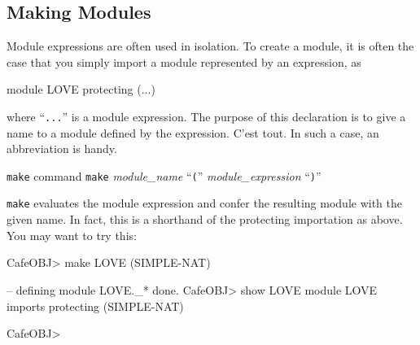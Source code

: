 \documentclass[a4paper]{memoir}
\begin{document}
\subsection{Making Modules}\label{sec:p2-make-command}

Module expressions are often used in isolation. To create a module, it is
often the case that you simply import a module represented by an expression,
as
\begin{vvtm}
\begin{ccode}
  module LOVE {
    protecting (...)
 }
\end{ccode}
\end{vvtm}
where ``\verb|...|'' is a module expression. The purpose of this
declaration is to give a name to a module defined by the expression.
C'est tout. In such a case, an abbreviation is handy.

\begin{bsyntax} \texttt{make} command  \Hline
\texttt{make} \textit{module\_name} ``\texttt{(}'' \textit{module\_expression} ``\texttt{)}''
\end{bsyntax}

\verb|make| evaluates the module expression and confer the resulting
module with the given name.
In fact, this is a shorthand of the protecting importation as above.
You may want to try this:
\begin{vvtm}
\begin{ccode}
  CafeOBJ> make LOVE (SIMPLE-NAT)

  -- defining module LOVE._* done.
  CafeOBJ> show LOVE
  module LOVE {
    imports {
      protecting (SIMPLE-NAT)
    }
  }

  CafeOBJ> 
\end{ccode}
\end{vvtm}
\end{document}
